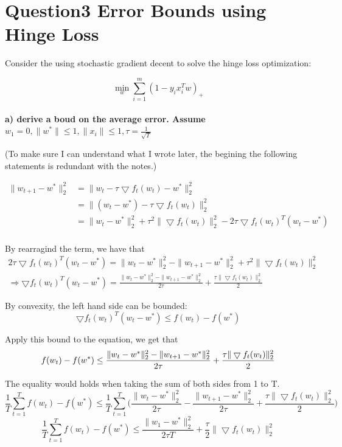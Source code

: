 \documentclass[paper=a4, fontsize=11pt]{scrartcl} %
\numberwithin{equation}{section} %
\numberwithin{figure}{section} %
\numberwithin{table}{section} %
\begin{document}
\newpage
\section*{Question3 Error Bounds using Hinge Loss}
Consider the using stochastic gradient decent to solve the hinge loss optimization: 

$$\underset{w}{\min} \sum_{i=1}^{m} (1 - y_i x_i^T w)_+ $$ \\ 
\textbf{a) derive a boud on the average error. Assume $w_1 = 0, \|w^* \| \leq 1, \|x_i \| \leq 1, \tau = \frac{1}{\sqrt{T}} $ }

(To make sure I can understand what I wrote later, the begining the following statements is redundant with the notes.)

\begin{align*}
\| w_{t+1} - w^* \|_2^2 & = \| w_{t} - \tau \bigtriangledown f_t(w_t) - w^* \|_2^2	\\
&= \| (w_{t} - w^*) - \tau \bigtriangledown f_t(w_t)  \|_2^2		\\
&= \|w_{t} - w^*\|_2^2 + \tau^2 \| \bigtriangledown f_t(w_t)  \|_2^2	 - 2 \tau \bigtriangledown f_t(w_t)^T (w_{t} - w^*)	\\
\end{align*}

By rearragind the term, we have that 
\begin{align*}
2 \tau \bigtriangledown f_t(w_t)^T (w_{t} - w^*) = 
\| w_{t} - w^*\|_2^2 - \| w_{t+1} - w^* \|_2^2 + \tau^2 \| \bigtriangledown f_t(w_t) \|_2^2	\\
\Rightarrow
\bigtriangledown f_t(w_t)^T (w_{t} - w^*) = \frac{\| w_{t} - w^*\|_2^2 - \| w_{t+1} - w^* \|_2^2}{2 \tau } + \frac{ \tau  \| \bigtriangledown f_t(w_t) \|_2^2}{2}
\end{align*}

By convexity, the left hand side can be bounded: 
$$
\bigtriangledown f_t(w_t)^T (w_{t} - w^*) \leq f(w_{t}) - f(w^*) 
$$

Apply this bound to the equation, we get that 
$$
f(w_{t}) - f(w^*) 
\leq 
\frac{\|w_{t} - w^*\|_2^2 - \| w_{t+1} - w^* \|_2^2}{2 \tau } + \frac{ \tau  \| \bigtriangledown f_t(w_t) \|_2^2}{2}	\\
$$

The equality would holds when taking the sum of both sides from 1 to T. 
$$
\frac{1}{T} \sum_{t=1}^{T} f(w_{t}) - f(w^*) 
\leq 
\frac{1}{T} \sum_{t=1}^{T} \Big(\frac{\| w_{t} - w^*\|_2^2}{2 \tau } -  \frac{\| w_{t+1} - w^* \|_2^2}{2 \tau }
+ \frac{ \tau  \| \bigtriangledown f_t(w_t) \|_2^2}{2} \Big)	
$$
$$
\frac{1}{T} \sum_{t=1}^{T} f(w_{t}) - f(w^*) 
\leq 
\frac{\| w_1 - w^*\|_2^2}{2 \tau T}
+ \frac{ \tau }{2} \| \bigtriangledown f_t(w_t) \|_2^2
$$
\end{document}
